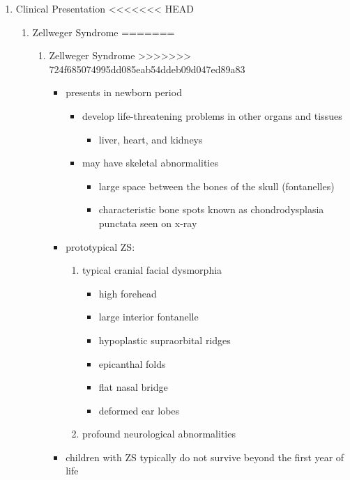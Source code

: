 \documentclass[fontsize=12pt]{scrartcl}
\begin{document}
\begin{enumerate}
\begin{enumerate}
\begin{enumerate}
\begin{enumerate}
\begin{table}[htbp]
\begin{enumerate}
\begin{enumerate}
\begin{enumerate}
\begin{enumerate}
\begin{enumerate}
\begin{enumerate}
\begin{enumerate}
\begin{enumerate}
\begin{enumerate}
\item Clinical Presentation
<<<<<<< HEAD
\label{sec:orgeb3e734}
\begin{enumerate}
\item Zellweger Syndrome
\label{sec:org38b3402}
=======
\label{sec:orgdcad969}
\begin{enumerate}
\item Zellweger Syndrome
\label{sec:orgb949f90}
>>>>>>> 724f685074995dd085eab54ddeb09d047ed89a83
\begin{itemize}
\item presents in newborn period
\begin{itemize}
\item develop life-threatening problems in other organs and tissues
\begin{itemize}
\item liver, heart, and kidneys
\end{itemize}
\item may have skeletal abnormalities
\begin{itemize}
\item large space between the bones of the skull (fontanelles)
\item characteristic bone spots known as chondrodysplasia punctata seen on x-ray
\end{itemize}
\end{itemize}
\item prototypical ZS:
\begin{enumerate}
\item typical cranial facial dysmorphia
\begin{itemize}
\item high forehead
\item large interior fontanelle
\item hypoplastic supraorbital ridges
\item epicanthal folds
\item flat nasal bridge
\item deformed ear lobes
\end{itemize}
\item profound neurological abnormalities
\end{enumerate}
\item children with ZS typically do not survive beyond the first year of life
\end{itemize}


\end{enumerate}
\end{enumerate}
\end{enumerate}
\end{enumerate}
\end{enumerate}
\end{enumerate}
\end{enumerate}
\end{enumerate}
\end{enumerate}
\end{enumerate}
\end{enumerate}
\end{table}
\end{enumerate}
\end{enumerate}
\end{enumerate}
\end{enumerate}
\end{document}
